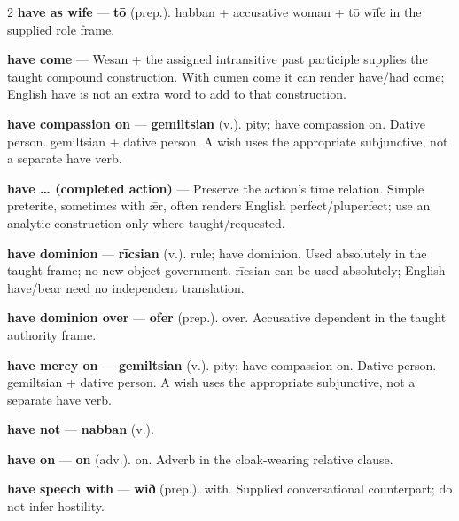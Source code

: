 \begin{multicols}{2}
\textbf{have as wife} — \textbf{tō} (prep.). habban + accusative woman + tō wīfe in the supplied role frame.\par
\textbf{have come} — Wesan + the assigned intransitive past participle supplies the taught compound construction. With cumen come it can render have/had come; English have is not an extra word to add to that construction.\par
\textbf{have compassion on} — \textbf{gemiltsian} (v.). pity; have compassion on. Dative person. gemiltsian + dative person. A wish uses the appropriate subjunctive, not a separate have verb.\par
\textbf{have … (completed action)} — Preserve the action's time relation. Simple preterite, sometimes with ǣr, often renders English perfect/pluperfect; use an analytic construction only where taught/requested.\par
\textbf{have dominion} — \textbf{rīcsian} (v.). rule; have dominion. Used absolutely in the taught frame; no new object government. rīcsian can be used absolutely; English have/bear need no independent translation.\par
\textbf{have dominion over} — \textbf{ofer} (prep.). over. Accusative dependent in the taught authority frame.\par
\textbf{have mercy on} — \textbf{gemiltsian} (v.). pity; have compassion on. Dative person. gemiltsian + dative person. A wish uses the appropriate subjunctive, not a separate have verb.\par
\textbf{have not} — \textbf{nabban} (v.).\par
\textbf{have on} — \textbf{on} (adv.). on. Adverb in the cloak-wearing relative clause.\par
\textbf{have speech with} — \textbf{wið} (prep.). with. Supplied conversational counterpart; do not infer hostility.\par

\end{multicols}
